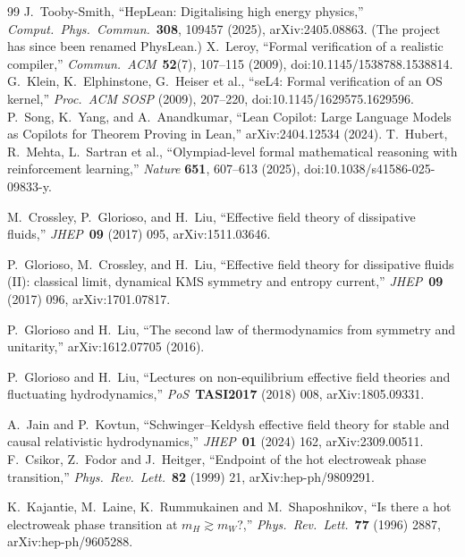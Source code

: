 \documentclass[11pt]{article}
\begin{document}
\begin{thebibliography}{99}
 J.~Tooby-Smith, ``HepLean: Digitalising
high energy physics,'' \emph{Comput.\ Phys.\ Commun.}\ \textbf{308},
109457 (2025), arXiv:2405.08863. (The project has since been renamed
PhysLean.)
 X.~Leroy, ``Formal verification of a realistic
compiler,'' \emph{Commun.\ ACM}\ \textbf{52}(7), 107--115 (2009),
doi:10.1145/1538788.1538814.
 G.~Klein, K.~Elphinstone, G.~Heiser et al., ``seL4:
Formal verification of an OS kernel,'' \emph{Proc.\ ACM SOSP} (2009),
207--220, doi:10.1145/1629575.1629596.
 P.~Song, K.~Yang, and A.~Anandkumar, ``Lean
Copilot: Large Language Models as Copilots for Theorem Proving in
Lean,'' arXiv:2404.12534 (2024).
 T.~Hubert, R.~Mehta, L.~Sartran et al.,
``Olympiad-level formal mathematical reasoning with reinforcement
learning,'' \emph{Nature} \textbf{651}, 607--613 (2025),
doi:10.1038/s41586-025-09833-y.

 M.~Crossley, P.~Glorioso, and
H.~Liu, ``Effective field theory of dissipative fluids,''
\emph{JHEP}\ \textbf{09} (2017) 095, arXiv:1511.03646.

 P.~Glorioso, M.~Crossley, and
H.~Liu, ``Effective field theory for dissipative fluids (II):
classical limit, dynamical KMS symmetry and entropy current,''
\emph{JHEP}\ \textbf{09} (2017) 096, arXiv:1701.07817.

 P.~Glorioso and H.~Liu, ``The second law
of thermodynamics from symmetry and unitarity,'' arXiv:1612.07705
(2016).

 P.~Glorioso and H.~Liu, ``Lectures
on non-equilibrium effective field theories and fluctuating
hydrodynamics,'' \emph{PoS}\ \textbf{TASI2017} (2018) 008,
arXiv:1805.09331.

 A.~Jain and P.~Kovtun, ``Schwinger--Keldysh
effective field theory for stable and causal relativistic
hydrodynamics,'' \emph{JHEP}\ \textbf{01} (2024) 162,
arXiv:2309.00511.
 F.~Csikor, Z.~Fodor and
J.~Heitger, ``Endpoint of the hot electroweak phase transition,''
\emph{Phys.\ Rev.\ Lett.}\ \textbf{82} (1999) 21,
arXiv:hep-ph/9809291.

 K.~Kajantie, M.~Laine, K.~Rummukainen and
M.~Shaposhnikov, ``Is there a hot electroweak phase transition at
$m_H \gtrsim m_W$?,'' \emph{Phys.\ Rev.\ Lett.}\ \textbf{77} (1996)
2887, arXiv:hep-ph/9605288.


\end{thebibliography}
\end{document}
